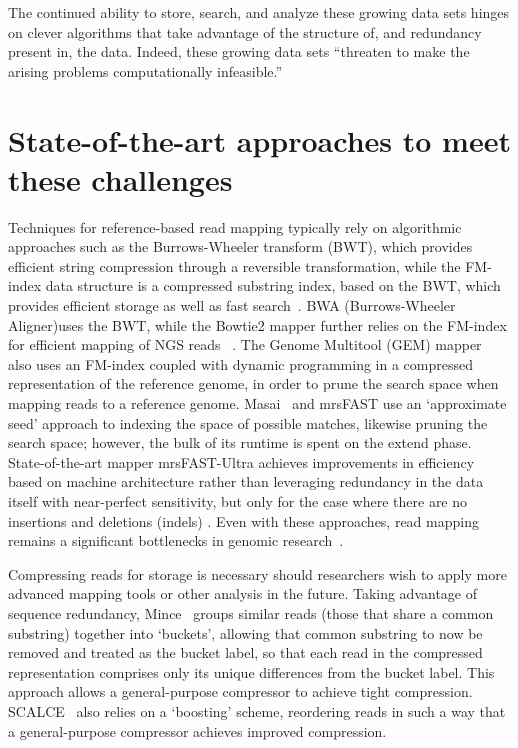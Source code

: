 \documentclass{acm_proc_article-sp}
\begin{document}
The continued ability to store, search, and analyze these growing data sets hinges on
clever algorithms that take advantage of the structure of, and redundancy 
present in, the data.
Indeed, these growing data sets ``threaten to make the arising problems 
computationally infeasible.''~\cite{berger2013computational}

\section{State-of-the-art approaches to meet these challenges}

Techniques for reference-based read mapping typically rely on algorithmic 
approaches such as the Burrows-Wheeler transform (BWT), 
which provides efficient string 
compression through a reversible transformation, while the FM-index data 
structure is a compressed substring index, 
based on the BWT, which provides efficient storage as well as fast search~\cite{berger2013computational}.
BWA (Burrows-Wheeler Aligner)uses the BWT, while the 
Bowtie2 mapper further relies on the FM-index for 
efficient mapping of NGS reads~\cite{berger2013computational} .
The Genome Multitool (GEM) mapper~\cite{marco2012gem} also uses an FM-index 
coupled with dynamic programming in a compressed representation of the 
reference genome, in order to prune the search space 
when mapping reads to a reference genome.
Masai~\cite{siragusa2013fast} and mrsFAST \cite{hach2010mrsfast} use an `approximate seed' approach to indexing
the space of possible matches, likewise pruning the search space; however, the
bulk of its runtime is spent on the extend phase.
State-of-the-art mapper mrsFAST-Ultra achieves improvements in efficiency based on machine architecture rather than leveraging redundancy in the data itself with near-perfect sensitivity, but
only for the case where there are no insertions and deletions (indels) \cite{hach2014mrsfast}.
Even with these approaches, read mapping remains a significant bottlenecks in
genomic research~\cite{berger2013computational}.

Compressing reads for storage is necessary should researchers wish to apply more advanced mapping tools or other analysis in the future.
Taking advantage of sequence redundancy, Mince~\cite{patro2015data} groups 
similar reads (those that share a common 
substring) together into `buckets', allowing that common substring to now be 
removed and treated as the bucket label, so that each read in the compressed 
representation comprises only its unique differences from the bucket label.
This approach allows a general-purpose compressor to achieve tight compression.
SCALCE~\cite{berger2013computational} also relies on a `boosting' scheme, 
reordering
reads in such a way that a general-purpose compressor achieves improved
compression.
\end{document}
